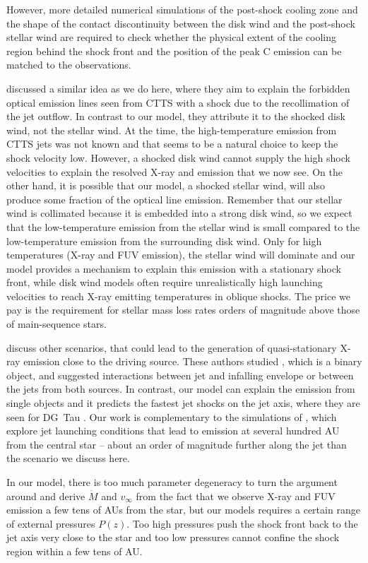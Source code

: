 However, more detailed numerical simulations of the post-shock cooling zone and the shape of the contact discontinuity between the disk wind and the post-shock stellar wind are required to check whether the physical extent of the cooling region behind the shock front and the position of the peak  C emission can be matched to the observations.

\citet{1993ApJ...409..748G} discussed a similar idea as we do here, where they aim to explain the forbidden optical emission lines seen from CTTS with a shock due to the recollimation of the jet outflow. In contrast to our model, they attribute it to the shocked disk wind, not the stellar wind. At the time, the high-temperature emission from CTTS jets was not known and that seems to be a natural choice to keep the shock velocity low. However, a shocked disk wind cannot supply the high shock velocities to explain the resolved X-ray and  emission that we now see. On the other hand, it is possible that our model, a shocked stellar wind, will also produce some fraction of the optical line emission.
Remember that our stellar wind is collimated because it is embedded into a strong disk wind, so we expect that the low-temperature emission from the stellar wind is small compared to the low-temperature emission from the surrounding disk wind. Only for high temperatures (X-ray and FUV emission), the stellar wind will dominate and our model provides a mechanism to explain this emission with a stationary shock front, while disk wind models often require unrealistically high launching velocities to reach X-ray emitting temperatures in oblique shocks. The price we pay is the requirement for stellar mass loss rates orders of magnitude above those of main-sequence stars.

\citet{2003ApJ...584..843B} discuss other scenarios, that could lead to the generation of quasi-stationary X-ray emission close to the driving source. These authors studied , which is a binary object, and suggested interactions between jet and infalling envelope or between the jets from both sources. In contrast, our model can explain the emission from single objects and it predicts the fastest jet shocks on the jet axis, where they are seen for DG~Tau \citep{2013A&A...550L...1S}. Our work is complementary to the simulations of \citet{2010A&A...511A..42B,2010A&A...517A..68B,2011ApJ...737...54B}, which explore jet launching conditions that lead to emission at several hundred AU from the central star -- about an order of magnitude further along the jet than the scenario we discuss here.

In our model, there is too much parameter degeneracy to turn the argument around and derive $\dot M$ and  $v_\infty$ from the fact that we observe X-ray and FUV emission a few tens of AUs from the star, but our models requires a certain range of external pressures $P(z)$. Too high pressures push the shock front back to the jet axis very close to the star and too low pressures cannot confine the shock region within a few tens of AU.

